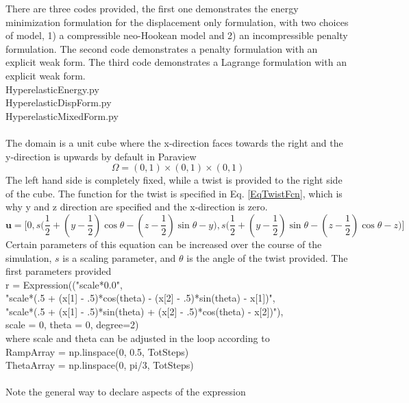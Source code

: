 \documentclass[12pt,3p]{article}
\begin{document}
There are three codes provided, the first one demonstrates the energy minimization formulation for the displacement only formulation, with two choices of model, 1) a compressible neo-Hookean model and 2) an incompressible penalty formulation. The second code demonstrates a penalty formulation with an explicit weak form. The third code demonstrates a Lagrange formulation with an explicit weak form. \\
{\selectfont
HyperelasticEnergy.py \\
HyperelasticDispForm.py \\ 
HyperelasticMixedForm.py \\ \\
}
The domain is a unit cube where the x-direction faces towards the right and the y-direction is upwards by default in Paraview 
\[ \Omega = (0,1) \times (0,1) \times (0,1)\] 
The left hand side is completely fixed, while a twist is provided to the right side of the cube. The function for the twist is specified in Eq. \ref{EqTwistFcn}, which is why y and z direction are specified and the x-direction is zero.
\begin{equation}\label{EqTwistFcn}
\mathbf{u} = 
	\bigg[ 0, 
	s \bigg(\frac{1}{2} + (y-\frac{1}{2}) \cos \theta - (z-\frac{1}{2}) \sin \theta - y \bigg),
	s \bigg( \frac{1}{2} + (y-\frac{1}{2}) \sin \theta - (z-\frac{1}{2}) \cos \theta - z \bigg) 
	\bigg] 
\end{equation}
Certain parameters of this equation can be increased over the course of the simulation, $s$ is a scaling parameter, and $\theta$ is the angle of the twist provided. The first parameters provided  \\
{\selectfont
r = Expression(("scale*0.0", \\
\indent "scale*(.5 + (x[1] - .5)*cos(theta) - (x[2] - .5)*sin(theta) - x[1])", \\
\indent "scale*(.5 + (x[1] - .5)*sin(theta) + (x[2] - .5)*cos(theta) - x[2])"), \\
\indent scale = 0, theta = 0, degree=2) \\ 
 }
where {\selectfont scale} and {\selectfont theta} can be adjusted in the loop according to \\
{\selectfont 
RampArray = np.linspace(0, 0.5, TotSteps)  \\
ThetaArray = np.linspace(0, pi/3, TotSteps) \\ \\
}
Note the general way to declare aspects of the expression \\
\end{document}
